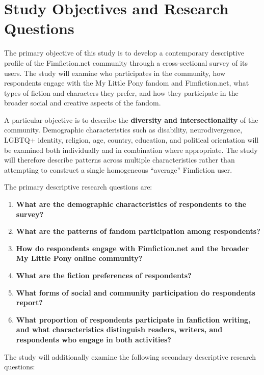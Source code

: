 \section{Study Objectives and Research Questions}
\label{sec:objectives}

The primary objective of this study is to develop a contemporary descriptive profile of the Fimfiction.net community through a cross-sectional survey of its users. The study will examine who participates in the community, how respondents engage with the My Little Pony fandom and Fimfiction.net, what types of fiction and characters they prefer, and how they participate in the broader social and creative aspects of the fandom.

A particular objective is to describe the \textbf{diversity and intersectionality} of the community. Demographic characteristics such as disability, neurodivergence, LGBTQ+ identity, religion, age, country, education, and political orientation will be examined both individually and in combination where appropriate. The study will therefore describe patterns across multiple characteristics rather than attempting to construct a single homogeneous ``average'' Fimfiction user.

The primary descriptive research questions are:

\begin{enumerate}
\item \textbf{What are the demographic characteristics of respondents to the survey?}
\item \textbf{What are the patterns of fandom participation among respondents?}
\item \textbf{How do respondents engage with Fimfiction.net and the broader My Little Pony online community?}
\item \textbf{What are the fiction preferences of respondents?}
\item \textbf{What forms of social and community participation do respondents report?}
\item \textbf{What proportion of respondents participate in fanfiction writing, and what characteristics distinguish readers, writers, and respondents who engage in both activities?}
\end{enumerate}

The study will additionally examine the following secondary descriptive research questions:

